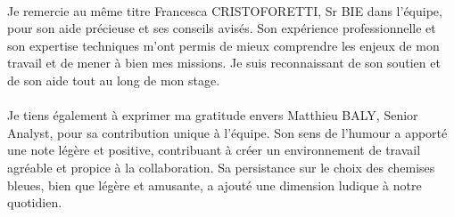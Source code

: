 \paragraph{}
Je remercie au même titre Francesca \MakeUppercase{Cristoforetti}, Sr BIE dans l'équipe, pour son aide précieuse et ses conseils avisés. Son expérience professionnelle et son expertise techniques m'ont permis de mieux comprendre les enjeux de mon travail et de mener à bien mes missions. 
Je suis reconnaissant de son soutien et de son aide tout au long de mon stage.
\paragraph{}
\vspace{-2em}
Je tiens également à exprimer ma gratitude envers Matthieu \MakeUppercase{Baly}, Senior Analyst, pour sa contribution unique à l'équipe. Son sens de l'humour a apporté une note légère et positive, contribuant à créer un environnement de travail agréable et propice à la collaboration. Sa persistance sur le choix des chemises bleues, bien que légère et amusante, a ajouté une dimension ludique à notre quotidien.